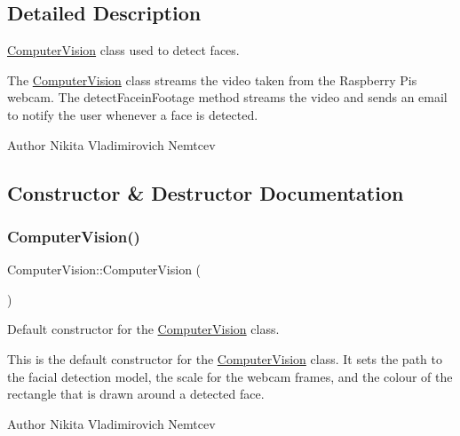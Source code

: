 \subsection{Detailed Description}
\hyperlink{classComputerVision}{Computer\+Vision} class used to detect faces. 

The \hyperlink{classComputerVision}{Computer\+Vision} class streams the video taken from the Raspberry Pi\textquotesingle{}s webcam. The detect\+Facein\+Footage method streams the video and sends an email to notify the user whenever a face is detected.

\begin{DoxyAuthor}{Author}
Nikita Vladimirovich Nemtcev 
\end{DoxyAuthor}


\subsection{Constructor \& Destructor Documentation}
\mbox{\label{classComputerVision_a0cf41397e6a6a8769319250e4637ae9c}} 
\subsubsection{\texorpdfstring{Computer\+Vision()}{ComputerVision()}}
{\footnotesize\ttfamily Computer\+Vision\+::\+Computer\+Vision (\begin{DoxyParamCaption}{ }\end{DoxyParamCaption})}



Default constructor for the \hyperlink{classComputerVision}{Computer\+Vision} class. 

This is the default constructor for the \hyperlink{classComputerVision}{Computer\+Vision} class. It sets the path to the facial detection model, the scale for the webcam frames, and the colour of the rectangle that is drawn around a detected face.

\begin{DoxyAuthor}{Author}
Nikita Vladimirovich Nemtcev 
\end{DoxyAuthor}
\mbox{\label{classComputerVision_ade7ffcea132abfa3c854b2de0fc73b86}} 
